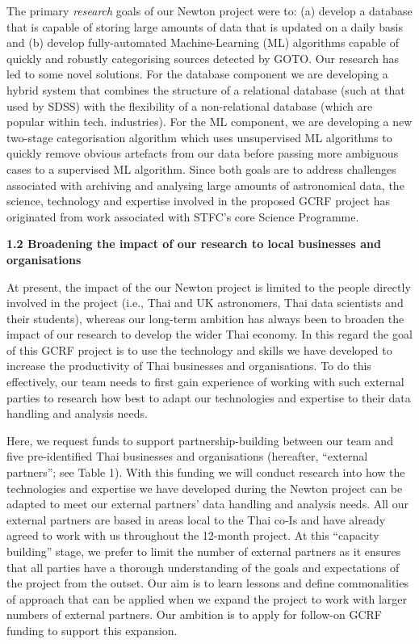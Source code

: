 \documentclass[11pt]{article}
\begin{document}
  \vspace{2mm}
  \noindent
  The primary {\it research} goals of our Newton project were to: (a) develop a database that is capable of storing large amounts of data that is updated on a daily basis and (b) develop fully-automated Machine-Learning (ML) algorithms capable of quickly and robustly categorising sources detected by GOTO. Our research has led to some novel solutions. For the database component we are developing a hybrid system that combines the structure of a relational database (such at that used by SDSS) with the flexibility of a non-relational database (which are popular within tech. industries). For the ML component, we are developing a new two-stage categorisation algorithm which uses unsupervised ML algorithms to quickly remove obvious artefacts from our data before passing more ambiguous cases to a supervised ML algorithm. Since both goals are to address challenges associated with archiving and analysing large amounts of astronomical data, the science, technology and expertise involved in the proposed GCRF project has originated from work associated with STFC's core Science Programme. 
  
  \vspace{3mm}
  \noindent
  {\large \bf 1.2 Broadening the impact of our research to local businesses and organisations}
  
  \noindent
  At present, the impact of the our Newton project is limited to the people directly involved in the project (i.e., Thai and UK astronomers, Thai data scientists and their students), whereas our long-term ambition has always been to broaden the impact of our research to develop the wider Thai economy. In this regard the goal of this GCRF project is to use the technology and skills we have developed to increase the productivity of Thai businesses and organisations. To do this effectively, our team needs to first gain experience of working with such external parties to research how best to adapt our technologies and expertise to their data handling and analysis needs.  
  
  \vspace{2mm}
  \noindent
  Here, we request funds to support partnership-building between our team and five pre-identified Thai businesses and organisations (hereafter, ``external partners''; see Table 1). With this funding we will conduct research into how the technologies and expertise we have developed during the Newton project can be adapted to meet our external partners' data handling and analysis needs. All our external partners are based in areas local to the Thai co-Is and have already agreed to work with us throughout the 12-month project. At this ``capacity building'' stage, we prefer to limit the number of external partners as it ensures that all parties have a thorough understanding of the goals and expectations of the project from the outset. Our aim is to learn lessons and define commonalities of approach that can be applied when we expand the project to work with larger numbers of external partners. Our ambition is to apply for follow-on GCRF funding to support this expansion.
  
\end{document}
